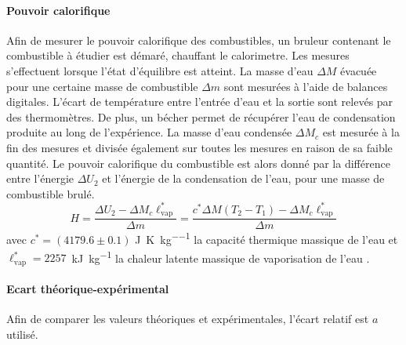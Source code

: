 \paragraph*{Pouvoir calorifique}
Afin de mesurer le pouvoir calorifique des combustibles, un bruleur contenant le combustible à étudier est démaré, chauffant le calorimetre. Les mesures s'effectuent lorsque l'état d'équilibre est atteint. La masse d'eau \(\Delta M\) évacuée pour une certaine masse de combustible \(\Delta m\) sont mesurées à l'aide de balances digitales. L'écart de température entre l'entrée d'eau et la sortie sont relevés par des thermomètres. De plus, un bécher permet de récupérer l'eau de condensation produite au long de l'expérience. La masse d'eau condensée \(\Delta M_c\) est mesurée à la fin des mesures et divisée également sur toutes les mesures en raison de sa faible quantité. Le pouvoir calorifique du combustible est alors donné par la différence entre l'énergie \(\Delta U_2\) et l'énergie de la condensation de l'eau, pour une masse de combustible brulé.
\begin{equation}
    H = \frac{\Delta U_2 - \Delta M_c \ell_\textrm{vap}^*}{\Delta m} = \frac{c^* \Delta M (T_2 - T_1) - \Delta M_c \ell_\textrm{vap}^*}{\Delta m}
    \label{eq:pouvoir_calorifique}
\end{equation}
avec \(c^* = (4179.6 \pm 0.1)\) \si{\joule\per\kelvin\per\kilo\gram} la capacité thermique massique de l'eau \cite{capacite-eau} et \mbox{\(\ell_\textrm{vap}^* = 2257\) \si{\kilo\joule\per\kilo\gram}} la chaleur latente massique de vaporisation de l'eau \cite{notice}.

\paragraph*{Ecart théorique-expérimental}
Afin de comparer les valeurs théoriques et expérimentales, l'écart relatif est \(a\) utilisé. 
